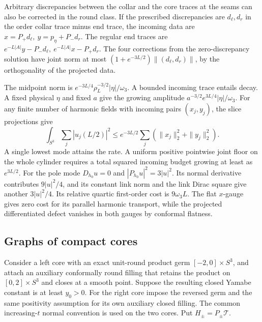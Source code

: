 \documentclass[11pt]{article}
\theoremstyle{remark}
\begin{document}
Arbitrary discrepancies between the collar and the core traces at the seams can also be corrected in the round class. If the prescribed discrepancies are \(d_\ell,d_r\) in the order collar trace minus end trace, the incoming data are \(x=P_+d_\ell,\ y=p_\eta+P_-d_r\). The regular end traces are \(e^{-L|A|}y-P_-d_\ell,\ e^{-L|A|}x-P_+d_r\). The four corrections from the zero-discrepancy solution have joint norm at most \((1+e^{-3L/2})\|(d_\ell,d_r)\|\), by the orthogonality of the projected data.

The midpoint norm is \(e^{-3L/4}\rho_L^{-3/2}|\eta|/\omega_3\). A bounded incoming trace entails decay. A fixed physical \(\eta\) and fixed \(a\) give the growing amplitude \(a^{-3/2}e^{3L/4}|\eta|/\omega_3\). For any finite number of harmonic fields with incoming pairs \((x_j,y_j)\), the slice projections give
\begin{equation}
 \int_{S^3}\sum_j|u_j(L/2)|^2
 \le e^{-3L/2}\sum_j(\|x_j\|_2^2+\|y_j\|_2^2).
 \label{eq:floor}
\end{equation}
A single lowest mode attains the rate. A uniform positive pointwise joint floor on the whole cylinder requires a total squared incoming budget growing at least as \(e^{3L/2}\). For the pole mode \(D_{h_0}u=0\) and \(|P_{h_0}u|^2=3|u|^2\). Its normal derivative contributes \(9|u|^2/4\), and its constant link norm and the link Dirac square give another \(3|u|^2/4\). Its relative quartic first-order cost is \(9\omega_3 L\). The flat \(x\)-gauge gives zero cost for its parallel harmonic transport, while the projected differentiated defect vanishes in both gauges by conformal flatness.

\subsection{Graphs of compact cores}
Consider a left core with an exact unit-round product germ \([-2,0]\times S^3\), and attach an auxiliary conformally round filling that retains the product on \([0,2]\times S^3\) and closes at a smooth point. Suppose the resulting closed Yamabe constant is at least \(y_0>0\). For the right core impose the reversed germ and the same positivity assumption for its own auxiliary closed filling. The common increasing-\(t\) normal convention is used on the two cores. Put \(H_\pm=P_\pm\mathcal T\).
\end{document}
